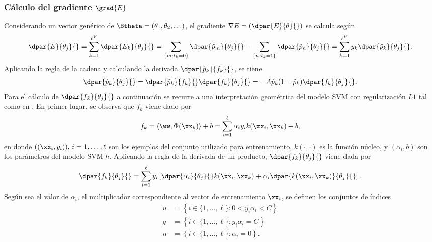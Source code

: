 %
\subsubsection{Cálculo del gradiente $\grad{E}$}
\label{se:gradE}
%
Considerando un vector genérico de 
$\Btheta=(\theta_1,\theta_2,\ldots)$, el gradiente
$\nabla{}E=\left(\dpar{E}{\theta}{}\right)$ se calcula según
%
\begin{align}
\label{gradE}
  \dpar{E}{\theta_j}{} = \sum_{k=1}^{\ell^V} \dpar{E_k}{\theta_j}{} =
  \sum_{ \{m:t_k=0\}  } \dpar{\hat{p}_m}{\theta_j}{}
  - \sum_{ \{n:t_k=1\}  } \dpar{\hat{p}_n}{\theta_j}{}
  = \sum_{k=1}^{\ell^V} y_k \dpar{\hat{p}_k}{\theta_j}{}.
\end{align}
%
Aplicando la regla de la cadena y calculando la derivada
$\dpar{\hat{p}_k}{f_k}{}$, se tiene
%
\begin{align}
  \dpar{\hat{p}_k}{\theta_j}{} =
  \dpar{\hat{p}_k}{f_k}{}\dpar{f_k}{\theta_j}{} =
  -A\hat{p}_k(1-\hat{p}_k)\dpar{f_k}{\theta_j}{}.
  \label{eq:deriv-pk-thetaj}
\end{align}
%
Para el cálculo de $\dpar{f_k}{\theta_j}{}$ a continuación se recurre
a una interpretación geométrica del modelo SVM con regularización $L1$
tal como en \cite{keerthi,glasmachers,shark}.
En primer lugar, se observa que $f_k$ viene dado por
%
\begin{align}
  f_k = \langle \ww,\Phi(\xx_k)\rangle+b
      = \sum_{i=1}^\ell \alpha_i y_i k(\xx_i,\xx_k) + b,
  \label{fk}
\end{align}
%
en donde $((\xx_i,y_i)),\,i=1,\ldots,\ell$ son los ejemplos del
conjunto utilizado para entrenamiento, $k(\cdot,\cdot)$ es la función
núcleo, y $(\alpha_i, b)$ son los parámetros del modelo SVM $h$.
Aplicando la regla de la derivada de un producto,
$\dpar{f_k}{\theta_j}{}$ viene dada por
\begin{align}
  \dpar{f_k}{\theta_j}{} = \sum_{i=1}^\ell y_i
  \left[\dpar{\alpha_i}{\theta_j}{} k(\xx_i,\xx_k) + \alpha_i
    \dpar{k(\xx_i,\xx_k)}{\theta_j}{} \right].
\end{align}
%
Según sea el valor de $\alpha_i$, el multiplicador correspondiente al
vector de entrenamiento $\xx_i$, se definen los conjuntos de índices
%
\begin{align}
  \label{unbounded-sv-set}
  u &= \left\{i\in\{1,\ldots,\ell\}:0<y_i\alpha_i<C \right\}\\
  \label{bounded-sv-set}
  g &= \left\{i\in\{1,\ldots,\ell\}: y_i\alpha_i=C \right\}\\
  n &= \left\{i\in\{1,\ldots,\ell\}: \alpha_i=0 \right\}.
\end{align}
